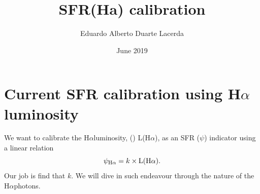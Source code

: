 \documentclass[12pt,letterpaper,usenatbib,useAMS]{article}
\title{SFR(Ha) calibration}
\author{Eduardo Alberto Duarte Lacerda}
\date{June 2019}
\def\Ha{\ifmmode \mathrm{H}\alpha \else H$\alpha$\xspace \fi}
\def\LHalpha{\ifmmode \mathrm{L}(\mathrm{H}\alpha) \else L(H$\alpha$)\xspace \fi}
\begin{document}
\maketitle

\section{Current SFR calibration using \Ha luminosity}
\label{sub:NebularSFR}

We want to calibrate the \Ha luminosity, \LHalpha, as an SFR ($\psi$) indicator \citep[e.g.][]{Kennicutt.1998a} using a linear relation
\begin{equation}
	\psi_{\Ha} = k \times \LHalpha.
	\label{eq:SFRHa}
\end{equation}
\noindent Our job is find that $k$. We will dive in such endeavour through the nature of the \Ha photons.
\end{document}
